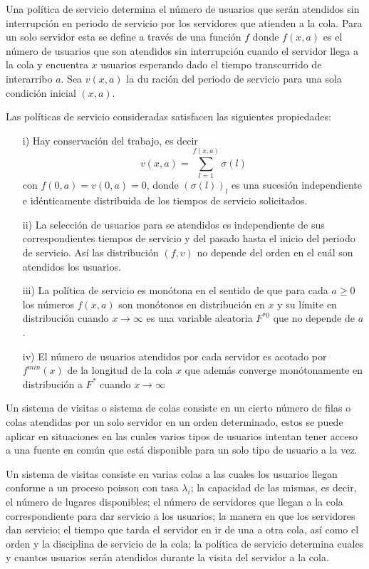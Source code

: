 \documentclass{article}
\begin{document}
Una pol\'itica de servicio determina el n\'umero de usuarios que ser\'an atendidos sin interrupci\'on en periodo de servicio por los servidores que atienden a la cola. Para un solo servidor esta se define a trav\'es de una funci\'on $f$ donde $f\left(x,a\right)$ es el n\'umero de usuarios que son atendidos sin interrupci\'on cuando el servidor llega a la cola y encuentra $x$ usuarios esperando dado el tiempo transcurrido de interarribo $a$. Sea $v\left(x,a\right)$ la du raci\'on del periodo de servicio para una sola condici\'on inicial $\left(x,a\right)$.

Las pol\'iticas de servicio consideradas satisfacen las siguientes
propiedades:

\begin{itemize}
\item[i)] Hay conservaci\'on del trabajo, es decir
\[v\left(x,a\right)=\sum_{l=1}^{f\left(x,a\right)}\sigma\left(l\right)\]
con $f\left(0,a\right)=v\left(0,a\right)=0$, donde
$\left(\sigma\left(l\right)\right)_{l}$ es una sucesi\'on independiente e id\'enticamente distribuida de los tiempos de servicio solicitados. 
\item[ii)] La selecci\'on de usuarios para se atendidos es independiente de sus correspondientes tiempos de servicio y del pasado hasta el inicio del periodo de servicio. As\'i las distribuci\'on $\left(f,v\right)$ no depende del orden en el cu\'al son atendidos los usuarios. \item[iii)] La pol\'itica de servicio es mon\'otona en el sentido de que para cada $a\geq0$ los n\'umeros $f\left(x,a\right)$ son mon\'otonos en distribuci\'on en $x$ y su l\'imite en distribuci\'on cuando $x\rightarrow\infty$ es una variable aleatoria $F^{*0}$ que no depende de $a$. \item[iv)] El n\'umero de usuarios atendidos por cada servidor es acotado por
$f^{min}\left(x\right)$ de la longitud de la cola $x$ que adem\'as converge mon\'otonamente en distribuci\'on a $F^{*}$ cuando $x\rightarrow\infty$
\end{itemize}



Un sistema de visitas o sistema de colas consiste en un cierto n\'umero de filas o colas atendidas por un solo servidor en un orden determinado, estos se puede aplicar en situaciones en las cuales varios tipos de usuarios intentan tener acceso a una fuente en com\'un que est\'a disponible para un solo tipo de usuario a la vez. 

Un sistema de visitas consiste en varias colas a las cuales los usuarios llegan conforme a un proceso poisson con tasa $\lambda_{i}$; la capacidad de las mismas, es decir, el n\'umero de lugares disponibles; el n\'umero de servidores que llegan a la cola correspondiente para dar servicio a los usuarios; la manera en que los servidores dan servicio; el tiempo que tarda el servidor en ir de una a otra cola, as\'i como el orden y la disciplina de servicio de la cola; la pol\'itica de servicio determina cuales y cuantos usuarios ser\'an atendidos durante la visita del servidor a la cola.\\
\end{document}
